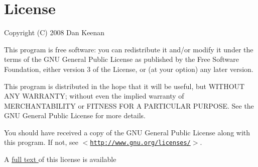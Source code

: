 \hypertarget{index_license}{}\section{License}\label{index_license}
Copyright (C) 2008 Dan Keenan

This program is free software: you can redistribute it and/or modify it under the terms of the GNU General Public License as published by the Free Software Foundation, either version 3 of the License, or (at your option) any later version.

This program is distributed in the hope that it will be useful, but WITHOUT ANY WARRANTY; without even the implied warranty of MERCHANTABILITY or FITNESS FOR A PARTICULAR PURPOSE. See the GNU General Public License for more details.

You should have received a copy of the GNU General Public License along with this program. If not, see $<$\href{http://www.gnu.org/licenses/}{\tt http://www.gnu.org/licenses/}$>$.



A \hyperlink{license}{full text } of this license is available 